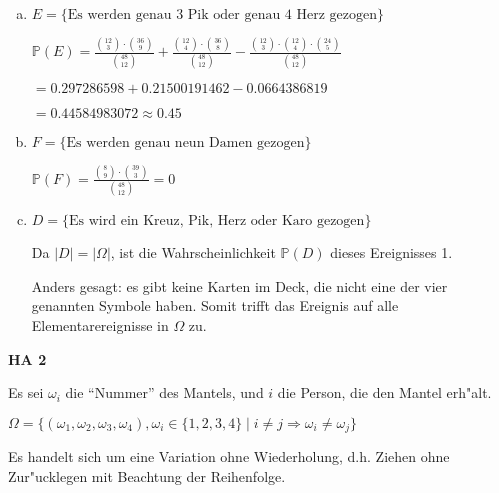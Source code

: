 \documentclass[a4paper,12pt]{article}
\newcommand{\Aufgabe}[1]{
        {
        \vspace*{0.5cm}
        \textbf{HA #1}
        \vspace*{0.2cm}
    }
}
\begin{document}
\begin{enumerate}[(a)]
        \item
        $ E = \{\text{Es werden genau 3 Pik oder genau 4 Herz gezogen}\} $

        $ \displaystyle \mathbb{P}(E) = \frac{\binom{12}{3} \cdot \binom{36}{9}}{\binom{48}{12}} + \frac{\binom{12}{4} \cdot \binom{36}{8}}{\binom{48}{12}} - \frac{\binom{12}{3} \cdot \binom{12}{4} \cdot \binom{24}{5}}{\binom{48}{12}} $

        $ = 0.297286598 + 0.21500191462 - 0.0664386819 $

        $ = 0.44584983072 \approx 0.45 $

        \item
        $ F = \{\text{Es werden genau neun Damen gezogen}\} $

        $ \displaystyle \mathbb{P}(F) = \frac{\binom{8}{9} \cdot \binom{39}{3}}{\binom{48}{12}} = 0 $

        \item
        $ D = \{\text{Es wird ein Kreuz, Pik, Herz oder Karo gezogen}\} $

        Da $ |D| = |\Omega| $, ist die Wahrscheinlichkeit $ \mathbb{P}(D) $ dieses Ereignisses 1.

        Anders gesagt: es gibt keine Karten im Deck, die nicht eine der vier genannten Symbole haben. 
        Somit trifft das Ereignis auf alle Elementarereignisse in $ \Omega $ zu.
    \end{enumerate}

    \Aufgabe{2}
    
    Es sei $ \omega_i $ die ``Nummer'' des Mantels, und $ i $ die Person, die den Mantel erh"alt.

    $ \Omega = \{(\omega_1, \omega_2, \omega_3, \omega_4), \omega_i \in \{1, 2, 3, 4\} \mid i \neq j \Rightarrow \omega_i \neq \omega_j\} $

    \bigskip

    Es handelt sich um eine Variation ohne Wiederholung, d.h. Ziehen ohne Zur"ucklegen mit Beachtung der Reihenfolge.
\end{document}
